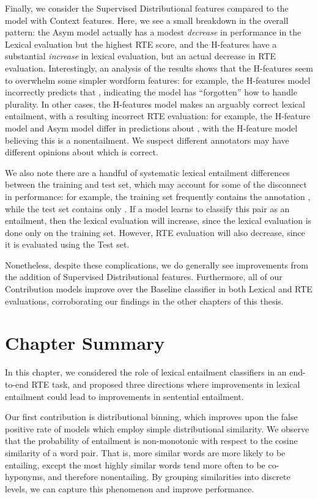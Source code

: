 Finally, we consider the Supervised Distributional features compared to the
model with Context features. Here, we see a small breakdown in the overall
pattern: the Asym model actually has a modest {\em decrease} in performance
in the Lexical evaluation but the highest RTE score, and the H-features have
a substantial {\em increase} in lexical evaluation, but an actual decrease
in RTE evaluation. Interestingly, an analysis of the results shows that the
H-features seem to overwhelm some simpler wordform features: for example,
the H-features model incorrectly predicts that ,
indicating the model has ``forgotten'' how to handle plurality. In other cases,
the H-features model makes an arguably correct lexical entailment, with
a resulting incorrect RTE evaluation: for example, the H-feature model and Asym
model differ in predictions about , with the
H-feature model believing this is a nonentailment. We suspect different
annotators may have different opinions about which is correct.

We also note there are a handful of systematic lexical entailment differences
between the training and test set, which may account for some of the disconnect
in performance: for example, the training set frequently contains the
annotation , while the test set contains only
. If a model learns to classify this pair as an
entailment, then the lexical evaluation will increase, since the lexical
evaluation is done only on the training set. However, RTE evaluation will also
decrease, since it is evaluated using the Test set.

Nonetheless, despite these complications, we do generally see improvements from
the addition of Supervised Distributional features. Furthermore, all of our
Contribution models improve over the Baseline classifier in both Lexical and
RTE evaluations, corroborating our findings in the other chapters of this
thesis.


\section{Chapter Summary}

In this chapter, we considered the role of lexical entailment classifiers in
an end-to-end RTE task, and proposed three directions where improvements in
lexical entailment could lead to improvements in sentential entailment.

Our first contribution is distributional binning, which improves upon the false
positive rate of models which employ simple distributional similarity. We observe
that the probability of entailment is non-monotonic with respect to the cosine
similarity of a word pair. That is, more similar words are more likely
to be entailing, except the most highly similar words tend more often to
be co-hyponyms, and therefore nonentailing. By grouping similarities into
discrete levels, we can capture this phenomenon and improve performance.

